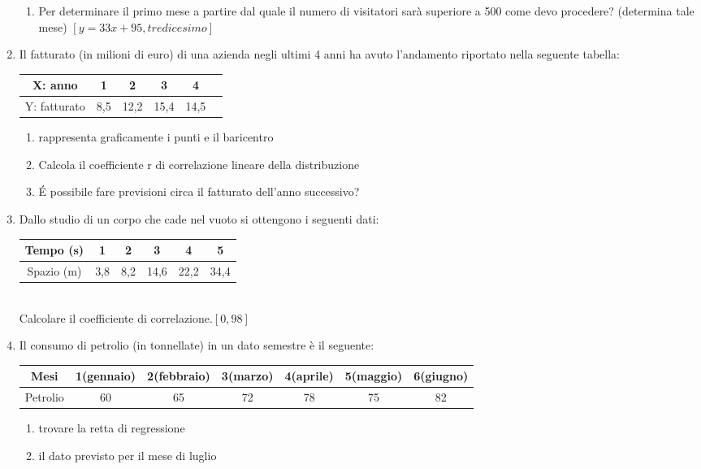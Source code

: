 \begin{enumerate}
\begin{enumerate}
        \item Per determinare il primo mese a partire dal quale il numero 
di visitatori sarà superiore a 500 come devo procedere? (determina tale 
mese) \hfill $[y=33x+95, tredicesimo]$
\end{enumerate}
\item Il fatturato (in milioni di euro) di una azienda negli ultimi 4 anni 
ha avuto l'andamento riportato nella seguente tabella:\\
\begin{tabular}{|c|c|c|c|c|c|}
        \hline
        X: anno&        1&      2&      3&      4\\
        \hline
        Y: fatturato&   8,5&    12,2&   15,4&   14,5\\
        \hline  
\end{tabular}

\begin{enumerate}
        \item rappresenta graficamente i punti e il baricentro
        \item Calcola il coefficiente r di correlazione lineare della 
distribuzione
        \item \'E possibile fare previsioni circa il fatturato dell'anno 
successivo?
\end{enumerate}
\item Dallo studio di un corpo che cade nel vuoto si ottengono i seguenti 
dati:\\
\begin{tabular}{|c|c|c|c|c|c|}
        \hline
Tempo (s)&      1&      2&      3&      4&      5\\
\hline
Spazio (m)&     3,8&    8,2&    14,6&   22,2&   34,4\\
\hline
\end{tabular}
\\Calcolare il coefficiente di correlazione.\hfill $[0,98]$

\item Il consumo di petrolio (in tonnellate) in un dato semestre è il 
seguente:\\
\begin{tabular}{|c|c|c|c|c|c|c|}
        \hline
Mesi&   {\scriptsize 1(gennaio)}&       {\scriptsize 2(febbraio)}&      
{\scriptsize 3(marzo)}  &{\scriptsize 4(aprile)}&       {\scriptsize 
5(maggio)}&     {\scriptsize 6(giugno)}\\
\hline
Petrolio&       60&     65&     72&     78&     75&     82\\
\hline
\end{tabular}
\begin{enumerate}
        \item trovare la retta di regressione
        \item il dato previsto per il mese di luglio
\end{enumerate} 


\end{enumerate}
